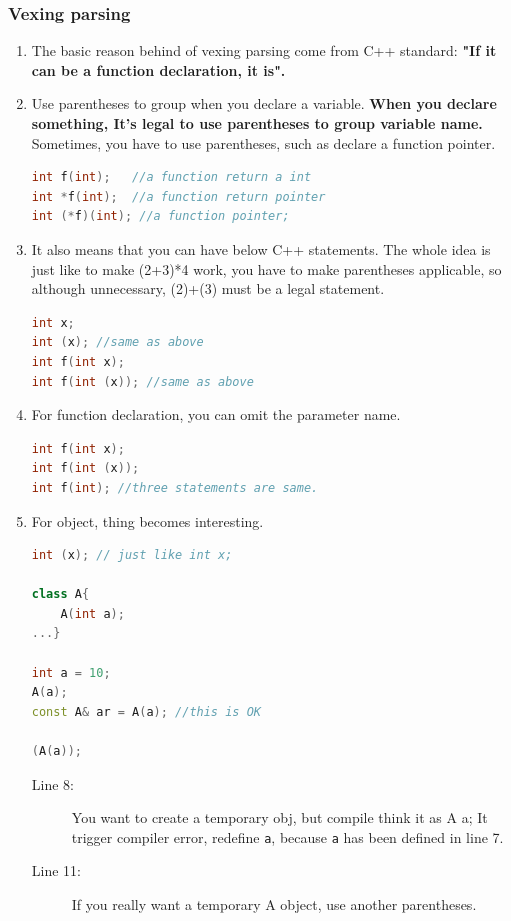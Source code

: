 \documentclass[a4paper,11pt,twoside]{book}
\begin{document}
\subsubsection{Vexing parsing}
\begin{enumerate}
	\item The basic reason behind of vexing parsing come from C++ standard: \textbf{"If it can be a function declaration, it is".}
	
	\item Use parentheses to group when you declare a variable. \textbf{When you declare something, It's legal to use parentheses to group variable name.} Sometimes, you have to use parentheses, such as declare a function pointer. 
\begin{lstlisting}[frame=single, language=c++, mathescape=true]
int f(int);   //a function return a int
int *f(int);  //a function return pointer
int (*f)(int); //a function pointer;  
\end{lstlisting}
	
	\item It also means that you can have below C++ statements. The whole idea is just like to make (2+3)*4 work, you have to make parentheses applicable, so although unnecessary, (2)+(3) must be a legal statement.
\begin{lstlisting}[frame=single, language=c++, mathescape=true]
int x;
int (x); //same as above
int f(int x);
int f(int (x)); //same as above
\end{lstlisting}
	
	\item For function declaration, you can omit the parameter name.  
\begin{lstlisting}[frame=single, language=c++, mathescape=true]
int f(int x);
int f(int (x));
int f(int); //three statements are same. 
\end{lstlisting}
	
	\item For object, thing becomes interesting.
\begin{lstlisting}[frame=single, language=c++, mathescape=true]
int (x); // just like int x;

class A{
	A(int a);
...}
	
int a = 10; 
A(a);
const A& ar = A(a); //this is OK

(A(a)); 
\end{lstlisting}
\begin{description}
	\item[Line 8:] You want to create a temporary obj, but compile think it as A a; It trigger compiler error, redefine \texttt{a}, because \texttt{a} has been defined in line 7.
	\item[Line 11:] If you really want a temporary A object, use another parentheses. 
\end{description}
	

\end{enumerate}
\end{document}
